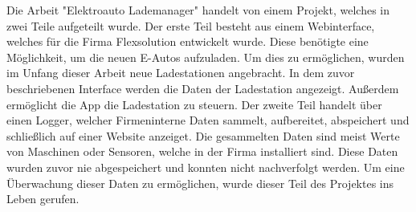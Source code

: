 Die Arbeit "Elektroauto Lademanager" handelt von einem Projekt, welches in zwei Teile aufgeteilt wurde.
Der erste Teil besteht aus einem Webinterface, welches für die Firma Flexsolution entwickelt wurde. Diese benötigte eine Möglichkeit, um die neuen E-Autos aufzuladen. Um dies zu ermöglichen, wurden im Unfang dieser Arbeit neue Ladestationen angebracht. In dem zuvor beschriebenen Interface werden die Daten der Ladestation angezeigt. Außerdem ermöglicht die App die Ladestation zu steuern.
Der zweite Teil handelt über einen Logger, welcher Firmeninterne Daten sammelt, aufbereitet, abspeichert und schließlich auf einer Website anzeiget. Die gesammelten Daten sind meist Werte von Maschinen oder Sensoren, welche in der Firma installiert sind. Diese Daten wurden zuvor nie abgespeichert und konnten nicht nachverfolgt werden. Um eine Überwachung dieser Daten zu ermöglichen, wurde dieser Teil des Projektes ins Leben gerufen.
